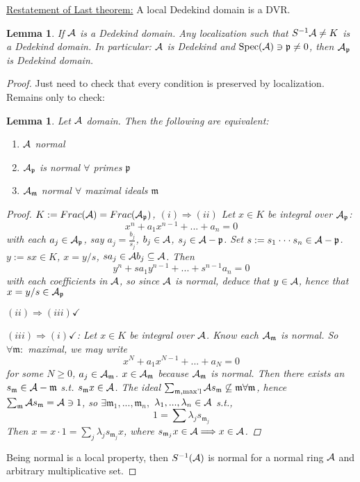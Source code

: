 \documentclass[11pt]{article}
\newtheorem{lemma}[thm]{Lemma}
\newcommand{\scm}{{\mathfrak m}}
\newcommand{\scp}{{\mathfrak p}}
\newcommand{\cala}{{\cal A}}
\newcommand{\Lrta}{\Longrightarrow}
\begin{document}
\underline{Restatement of Last theorem:} A local Dedekind domain is a DVR. 
\begin{lemma}If $\cala$ is a Dedekind domain.
Any localization such that $S^{-1}\cala\neq K$ is a Dedekind domain. In particular: $\cala$ is Dedekind and $\text{Spec}(\cala)\ni\scp\neq 0$, then $\cala_\scp$ is Dedekind domain.
\end{lemma} 
\begin{proof}
Just need to check that every condition is preserved by localization. Remains only to check:
\begin{lemma}
Let $\cala$ domain. Then the following are equivalent:
\begin{enumerate}[label=(\roman*)]
\item $\cala$ normal
\item $\cala_\scp$ is normal $\forall$ primes $\scp$
\item $\cala_\scm$ normal $\forall$ maximal ideals $\scm$
\end{enumerate}
\begin{proof}
$K:= Frac(\cala)=Frac(\cala_\scp)$,
$(i)\Lrta (ii)$ Let $x\in K$ be integral over $\cala_\scp$: 
$$
x^n+a_1 x^{n-1}+...+a_n=0
$$
with each $a_j\in\cala_\scp$, say $a_j=\frac{b_j}{s_j}$, $b_j\in \cala$, $s_j\in\cala-\scp$.
Set $s:=s_1\cdot\cdot\cdot s_n\in\cala-\scp$. $y:=sx\in K$, $x=y/s$, $sa_j\in\cala b_j\subseteq \cala$.
Then 
$$
y^n+s a_1 y^{n-1}+...+s^{n-1}a_n
=0
$$
with each coefficients in $\cala$, so since $\cala$ is normal, deduce that $y\in\cala$, hence that $x=y/s\in\cala_\scp$

$(ii)\Lrta (iii)\checkmark$

$(iii)\Lrta (i)\checkmark$: Let $x\in K$ be integral over $\cala$. Know each $\cala_\scm$ is normal. So $\forall \scm:$ maximal, we may write 
$$
x^{N}+a_1x^{N-1}+...+a_{N}=0
$$
for some $N\geq 0$, $a_{j}\in\cala_\scm$. $x\in\cala_\scm$ because $\cala_\scm$ is normal. Then there exists an $s_\scm\in\cala-\scm$ s.t. $s_\scm x\in\cala$. The ideal $\sum_{\scm,\text{max'l}}\cala s_\scm\not\subseteq \scm\forall\scm$, hence $\sum_{\scm}\cala s_\scm=\cala\ni 1$, so $\exists \scm_1,...,\scm_n,$ $\lambda_1,...,\lambda_n\in \cala$ s.t.,
$$
1=\sum\lambda_js_{\scm_j}
$$
Then $x=x\cdot 1=\sum_j\lambda_j s_{\scm_j}x$, where $s_{\scm_j}x\in\cala\Lrta x\in\cala$.
\end{proof}
\end{lemma}
Being normal is a local property, then $S^{-1}(\cala)$ is normal for a normal ring $\cala$ and arbitrary multiplicative set.
\end{proof}
\end{document}
